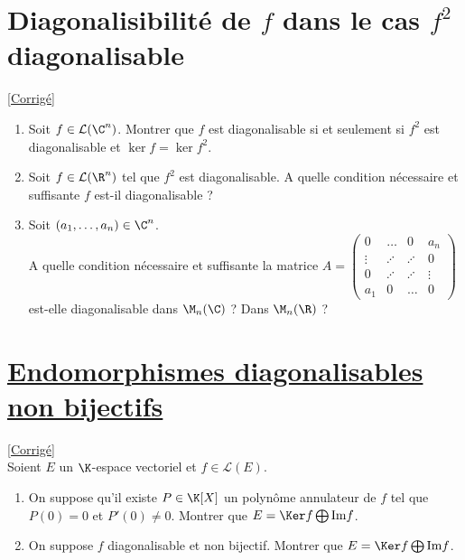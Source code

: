 \documentclass[8pt]{book}
\begin{document}
	\section{Diagonalisibilité de $f$ dans le cas $f^2$ diagonalisable }
	\label{Diagonalisabilité de f dans le cas f^2 diagonalisable}
	\textcolor{blue}{\hyperref[Diagonalisabilité de f dans le cas f^2 diagonalisable corrigé]{[Corrigé]}}\\
	\begin{enumerate}[leftmargin=*]
		\item Soit $f\in \mathcal L(\C^n)$. Montrer que $f$ est diagonalisable si et seulement si $f^2$ est diagonalisable et $\ker f=\ker f^2$.
		\item Soit $f\in \mathcal L(\R^n)$ tel que $f^2$ est diagonalisable. A quelle condition nécessaire et suffisante $f$ est-il diagonalisable ?
		\item Soit $(a_1,\dots,a_n)\in \C^n$.\\ A quelle condition nécessaire et suffisante la matrice $A=\begin{pmatrix}
			0&\dots&0&a_n\\
			\vdots&\iddots &\iddots&0\\
			0&\iddots&\iddots&\vdots\\
			a_1&0&\dots&0
		\end{pmatrix}$
		est-elle diagonalisable dans $\M_n(\C)$ ? Dans $\M_n(\R)$ ?
	\end{enumerate}
	
	\section{\underline{Endomorphismes diagonalisables non bijectifs} }
	\label{Endomorphismes diagonalisables non bijectifs}
	\textcolor{blue}{\hyperref[Endomorphismes diagonalisables non bijectifs corrigé]{[Corrigé]}}\\
	Soient $E$ un $\K$-espace vectoriel et $f\in \mathcal L(E)$.
	\begin{enumerate}
		\item On suppose qu'il existe $P\in \K[X]$ un polynôme annulateur de $f$ tel que $P(0)=0$ et $P'(0)\ne0$. Montrer que $E=\Ker f\bigoplus\text{Im}f$.
		\item On suppose $f$ diagonalisable et non bijectif. Montrer que $E=\Ker f\bigoplus\text{Im}f$.
	\end{enumerate}
	
\end{document}
